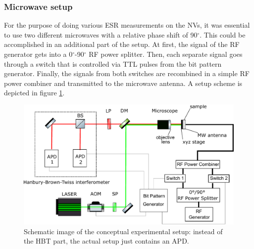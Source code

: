 \documentclass[12pt,a4paper]{article}
\begin{document}
\subsubsection{Microwave setup}
For the purpose of doing various ESR measurements on the NVs, it was essential to use two different microwaves with a relative phase shift of 90$^\circ$. This could be accomplished in an additional part of the setup. At first, the signal of the RF generator gets into a 0$^\circ$-90$^\circ$ RF power splitter. Then, each separate signal goes through a switch that is controlled via TTL pulses from the bit pattern generator. Finally, the signals from both switches are recombined in a simple RF power combiner and transmitted to the microwave antenna. A setup scheme is depicted in figure \ref{setup}.
\begin{figure}[H]
\centering
\includegraphics[scale=0.7]{setup4.pdf} 
\caption{Schematic image of the conceptual experimental setup: instead of the HBT part, the actual setup just contains an APD.}
\label{setup}
\end{figure}
\end{document}
